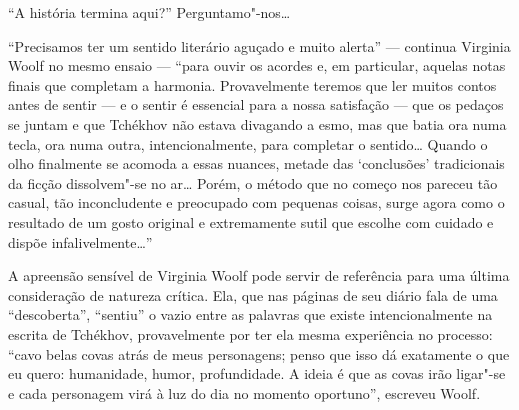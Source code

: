 ``A história termina aqui?'' Perguntamo"-nos\ldots{}

``Precisamos ter um sentido
literário aguçado e muito alerta'' ---
continua Virginia Woolf no mesmo ensaio --- ``para
ouvir os acordes e, em particular, aquelas notas finais que completam a harmonia.
Provavelmente teremos que ler muitos contos antes de sentir ---
e o sentir é essencial para a nossa satisfação --- que os pedaços
se juntam e que Tchékhov não estava divagando a esmo, mas que batia
ora numa tecla, ora numa outra, intencionalmente, para completar o
sentido\ldots{} Quando o olho finalmente se acomoda a essas nuances,
metade das `conclusões' tradicionais da ficção dissolvem"-se no
ar\ldots{} Porém, o método que no começo nos pareceu tão casual,
tão inconcludente e preocupado com pequenas coisas, surge agora
como o resultado de um gosto original e extremamente sutil que
escolhe com cuidado e dispõe infalivelmente\ldots{}''

A apreensão sensível de Virginia Woolf pode servir de referência
para uma última consideração de natureza crítica. Ela, que nas
páginas de seu diário fala de uma ``descoberta'', ``sentiu'' o
vazio entre as palavras que existe intencionalmente na escrita
de Tchékhov, provavelmente por ter ela mesma experiência no
processo: ``cavo belas covas atrás de meus personagens; penso que
isso dá exatamente o que eu quero: humanidade, humor, profundidade.
A ideia é que as covas irão ligar"-se e cada personagem virá à luz
do dia no momento oportuno'', escreveu Woolf. 

